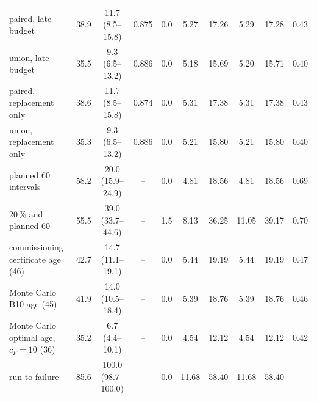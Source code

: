 \begin{table}[htbp]
\begin{tabular*}{\textwidth}{@{\extracolsep{\fill}}lccccccccc@{}}
paired, late budget & 38.9 & 11.7 (8.5--15.8) & 0.875 & 0.0 & 5.27 & 17.26 & 5.29 & 17.28 & 0.43 \\
union, late budget & 35.5 & 9.3 (6.5--13.2) & 0.886 & 0.0 & 5.18 & 15.69 & 5.20 & 15.71 & 0.40 \\
paired, replacement only & 38.6 & 11.7 (8.5--15.8) & 0.874 & 0.0 & 5.31 & 17.38 & 5.31 & 17.38 & 0.43 \\
union, replacement only & 35.3 & 9.3 (6.5--13.2) & 0.886 & 0.0 & 5.21 & 15.80 & 5.21 & 15.80 & 0.40 \\
planned 60 intervals & 58.2 & 20.0 (15.9--24.9) & -- & 0.0 & 4.81 & 18.56 & 4.81 & 18.56 & 0.69 \\
20\,\% and planned 60 & 55.5 & 39.0 (33.7--44.6) & -- & 1.5 & 8.13 & 36.25 & 11.05 & 39.17 & 0.70 \\
commissioning certificate age (46) & 42.7 & 14.7 (11.1--19.1) & -- & 0.0 & 5.44 & 19.19 & 5.44 & 19.19 & 0.47 \\
Monte Carlo B10 age (45) & 41.9 & 14.0 (10.5--18.4) & -- & 0.0 & 5.39 & 18.76 & 5.39 & 18.76 & 0.46 \\
Monte Carlo optimal age, $c_F=10$ (36) & 35.2 & 6.7 (4.4--10.1) & -- & 0.0 & 4.54 & 12.12 & 4.54 & 12.12 & 0.42 \\
run to failure & 85.6 & 100.0 (98.7--100.0) & -- & 0.0 & 11.68 & 58.40 & 11.68 & 58.40 & -- \\
\bottomrule
\end{tabular*}
\end{table}

